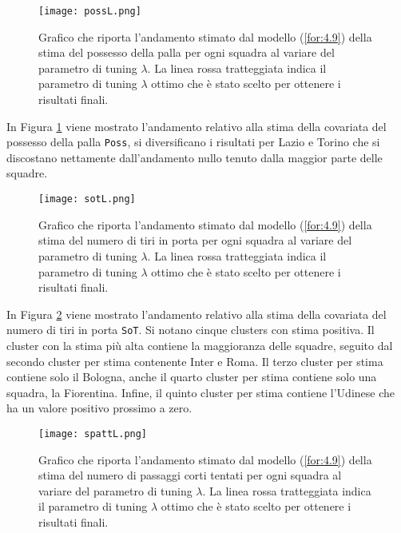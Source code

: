 \begin{figure}[htbp]
	\begin{center}
		\texttt{[image: possL.png]}
		\caption{Grafico che riporta l'andamento stimato dal modello (\ref{for:4.9}) della stima del possesso della palla per ogni squadra al variare del parametro di tuning $\lambda$. La linea rossa tratteggiata indica il parametro di tuning $\lambda$ ottimo che è stato scelto per ottenere i risultati finali.} \label{fig:possL}
	\end{center}
\end{figure}

In Figura \ref{fig:possL} viene mostrato l'andamento relativo alla stima della covariata del possesso della palla \texttt{Poss}, si diversificano i risultati per Lazio e Torino che si discostano nettamente dall'andamento nullo tenuto dalla maggior parte delle squadre.

\begin{figure}[htbp]
	\begin{center}
		\texttt{[image: sotL.png]}
		\caption{Grafico che riporta l'andamento stimato dal modello (\ref{for:4.9}) della stima del numero di tiri in porta per ogni squadra al variare del parametro di tuning $\lambda$. La linea rossa tratteggiata indica il parametro di tuning $\lambda$ ottimo che è stato scelto per ottenere i risultati finali.} \label{fig:sotL}
	\end{center}
\end{figure}

In Figura \ref{fig:sotL} viene mostrato l'andamento relativo alla stima della covariata del numero di tiri in porta \texttt{SoT}. Si notano cinque clusters con stima positiva. Il cluster con la stima più alta contiene la maggioranza delle squadre, seguito dal secondo cluster per stima contenente Inter e Roma. Il terzo cluster per stima contiene solo il Bologna, anche il quarto cluster per stima contiene solo una squadra, la Fiorentina. Infine, il quinto cluster per stima contiene l'Udinese che ha un valore positivo prossimo a zero.

\begin{figure}[htbp]
	\begin{center}
		\texttt{[image: spattL.png]}
		\caption{Grafico che riporta l'andamento stimato dal modello (\ref{for:4.9}) della stima del numero di passaggi corti tentati per ogni squadra al variare del parametro di tuning $\lambda$. La linea rossa tratteggiata indica il parametro di tuning $\lambda$ ottimo che è stato scelto per ottenere i risultati finali.} \label{fig:spattL}
	\end{center}
\end{figure}

